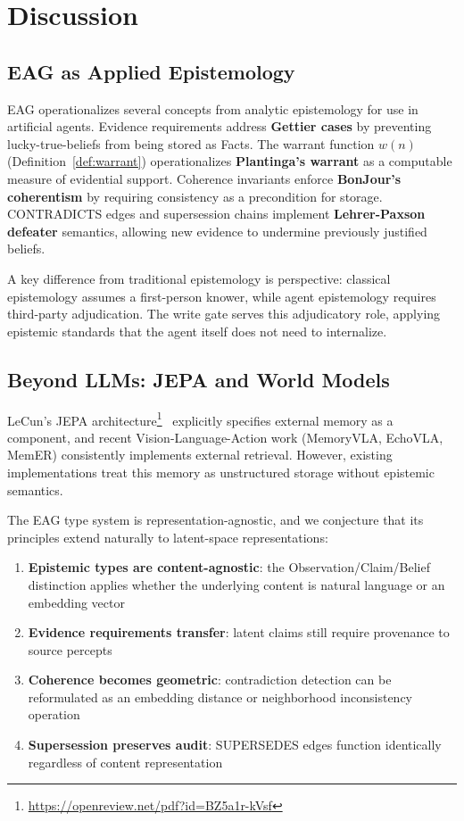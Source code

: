 \documentclass[11pt,letterpaper]{article}
\begin{document}
\section{Discussion}
\label{sec:discussion}

\subsection{EAG as Applied Epistemology}

EAG operationalizes several concepts from analytic epistemology for use in artificial agents. Evidence requirements address \textbf{Gettier cases} by preventing lucky-true-beliefs from being stored as Facts. The warrant function $w(n)$ (Definition~\ref{def:warrant}) operationalizes \textbf{Plantinga's warrant} as a computable measure of evidential support. Coherence invariants enforce \textbf{BonJour's coherentism} by requiring consistency as a precondition for storage. CONTRADICTS edges and supersession chains implement \textbf{Lehrer-Paxson defeater} semantics, allowing new evidence to undermine previously justified beliefs.

A key difference from traditional epistemology is perspective: classical epistemology assumes a first-person knower, while agent epistemology requires third-party adjudication. The write gate serves this adjudicatory role, applying epistemic standards that the agent itself does not need to internalize.

\subsection{Beyond LLMs: JEPA and World Models}

LeCun's JEPA architecture\footnote{\url{https://openreview.net/pdf?id=BZ5a1r-kVsf}}~\cite{lecun2022path} explicitly specifies external memory as a component, and recent Vision-Language-Action work (MemoryVLA, EchoVLA, MemER) consistently implements external retrieval. However, existing implementations treat this memory as unstructured storage without epistemic semantics.

The EAG type system is representation-agnostic, and we conjecture that its principles extend naturally to latent-space representations:
\begin{enumerate}[noitemsep]
    \item \textbf{Epistemic types are content-agnostic}: the Observation/Claim/Belief distinction applies whether the underlying content is natural language or an embedding vector
    \item \textbf{Evidence requirements transfer}: latent claims still require provenance to source percepts
    \item \textbf{Coherence becomes geometric}: contradiction detection can be reformulated as an embedding distance or neighborhood inconsistency operation
    \item \textbf{Supersession preserves audit}: SUPERSEDES edges function identically regardless of content representation
\end{enumerate}
\end{document}
